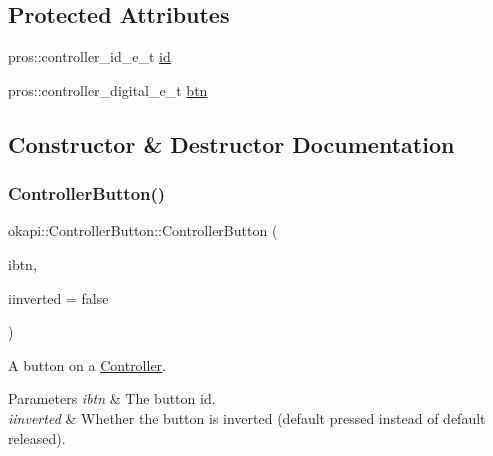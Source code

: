 \subsection*{Protected Attributes}
\begin{DoxyCompactItemize}
\item 
pros\+::controller\+\_\+id\+\_\+e\+\_\+t \mbox{\hyperlink{classokapi_1_1ControllerButton_a0e671c560eccd470d1a00f3f5444cc53}{id}}
\item 
pros\+::controller\+\_\+digital\+\_\+e\+\_\+t \mbox{\hyperlink{classokapi_1_1ControllerButton_aec7d466c709dac6876d8f27245afde1e}{btn}}
\end{DoxyCompactItemize}


\subsection{Constructor \& Destructor Documentation}
\mbox{\label{classokapi_1_1ControllerButton_a4c82179b73b34bae616c5fe180c207a4}} 
\subsubsection{\texorpdfstring{ControllerButton()}{ControllerButton()}\hspace{0.1cm}{\footnotesize\ttfamily [1/2]}}
{\footnotesize\ttfamily okapi\+::\+Controller\+Button\+::\+Controller\+Button (\begin{DoxyParamCaption}\item[{\mbox{\hyperlink{namespaceokapi_af5040b3f1f33d27698871423e1453ab6}{Controller\+Digital}}}]{ibtn,  }\item[{bool}]{iinverted = {\ttfamily false} }\end{DoxyParamCaption})}

A button on a \mbox{\hyperlink{classokapi_1_1Controller}{Controller}}.


\begin{DoxyParams}{Parameters}
{\em ibtn} & The button id. \\
\hline
{\em iinverted} & Whether the button is inverted (default pressed instead of default released). \\
\hline
\end{DoxyParams}
\mbox{\label{classokapi_1_1ControllerButton_a491473201555bb78fb5dc20666e12bcf}} 
